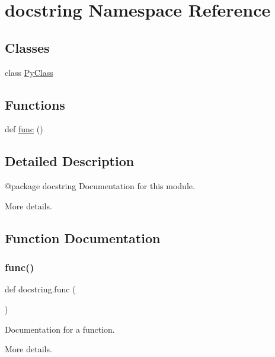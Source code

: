 \hypertarget{namespacedocstring}{}\section{docstring Namespace Reference}
\label{namespacedocstring}
\subsection*{Classes}
\begin{DoxyCompactItemize}
\item 
class \mbox{\hyperlink{classdocstring_1_1_py_class}{Py\+Class}}
\end{DoxyCompactItemize}
\subsection*{Functions}
\begin{DoxyCompactItemize}
\item 
def \mbox{\hyperlink{namespacedocstring_aec1a168f6e16b33f87fe6a37b9208957}{func}} ()
\end{DoxyCompactItemize}


\subsection{Detailed Description}
\begin{DoxyVerb}@package docstring
Documentation for this module.

More details.
\end{DoxyVerb}
 

\subsection{Function Documentation}
\mbox{\label{namespacedocstring_aec1a168f6e16b33f87fe6a37b9208957}} 
\subsubsection{\texorpdfstring{func()}{func()}}
{\footnotesize\ttfamily def docstring.\+func (\begin{DoxyParamCaption}{ }\end{DoxyParamCaption})}

\begin{DoxyVerb}Documentation for a function.

More details.
\end{DoxyVerb}
 